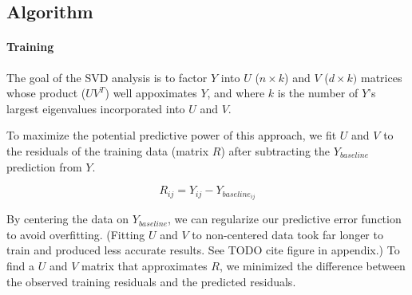 \documentclass[12pt]{article}
\begin{document}

\subsection*{Algorithm}
\paragraph{Training} The goal of the SVD analysis is to factor $Y$ into $U$ ($n \times k$) and $V$ ($d \times k)$ matrices whose product ($U V^T$) well appoximates $Y$, and where $k$ is the number of $Y$'s largest eigenvalues incorporated into $U$ and $V$. 

To maximize the potential predictive power of this approach, we fit $U$ and $V$ to the residuals of the training data (matrix $R$) after subtracting the $Y_{baseline}$ prediction from $Y$.

 $$ R_{ij} = Y_{ij} - Y_{baseline_{ij}} $$

 By centering the data on $Y_{baseline}$, we can regularize our predictive error function to avoid overfitting. (Fitting $U$ and $V$ to non-centered data took far longer to train and produced less accurate results. See TODO cite figure in appendix.) To find a $U$ and $V$ matrix that approximates $R$, we minimized the difference between the observed training residuals and the predicted residuals.
\end{document}
